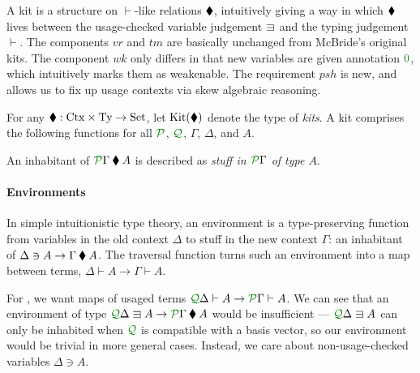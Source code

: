 \documentclass[submission,copyright,creativecommons]{eptcs}
\begin{document}
A kit is a structure on $\vdash$-like relations $\mathbin{\blacklozenge}$, intuitively
giving a way in which $\mathbin{\blacklozenge}$ lives between the usage-checked variable
judgement $\lvar$ and the typing judgement $\vdash$.
The components $\mathit{vr}$ and $\mathit{tm}$ are basically unchanged from
McBride's original kits.
The component $\mathit{wk}$ only differs in that new variables are given
annotation $\rescomment 0$, which intuitively marks them as weakenable.
The requirement $\mathit{psh}$ is new, and allows us to fix up usage contexts
via skew algebraic reasoning.

\begin{definition}\label{def:kit}
  For any $\mathbin{\blacklozenge} : \mathrm{Ctx} \times \mathrm{Ty} \to \mathrm{Set}$, let
  $\operatorname{Kit}(\mathbin{\blacklozenge})$ denote the type of \emph{kits}.
  A kit comprises the following functions for all $\resctx P$, $\resctx Q$,
  $\Gamma$, $\Delta$, and $A$.
\end{definition}

An inhabitant of $\ctx{\Gamma}{P} \kitrel A$ is described as
\emph{stuff in $\ctx{\Gamma}{P}$ of type $A$}.

\paragraph{Environments} In simple intuitionistic type theory, an
environment is a type-preserving function from variables in the old
context $\Delta$ to stuff in the new context $\Gamma$: an inhabitant
of $\Delta \ni A \to \Gamma \mathbin{\blacklozenge} A$.  The traversal function turns
such an environment into a map between terms,
$\Delta \vdash A \to \Gamma \vdash A$.

For \name{}, we want maps of usaged terms
$\ctx{\Delta}{Q} \vdash A \to \ctx{\Gamma}{P} \vdash A$.
We can see that an environment of type
$\ctx{\Delta}{Q} \lvar A \to \ctx{\Gamma}{P} \kitrel A$ would
be insufficient --- $\ctx{\Delta}{Q} \lvar A$ can only be inhabited when
$\resctx Q$ is compatible with a basis vector, so our environment would be
trivial in more general cases.
Instead, we care about non-usage-checked variables $\Delta \ni A$.
\end{document}
